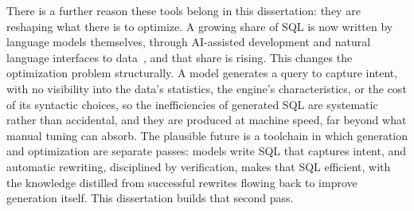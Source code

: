 There is a further reason these tools belong in this dissertation:
they are reshaping what there is to optimize. A growing share of SQL
is now written by language models themselves, through AI-assisted
development and natural language interfaces to
data~\cite{dbt2025state}, and that share is rising. This changes the
optimization problem structurally. A model generates a query to
capture intent, with no visibility into the data's statistics, the
engine's characteristics, or the cost of its syntactic choices, so
the inefficiencies of generated SQL are systematic rather than
accidental, and they are produced at machine speed, far beyond what
manual tuning can absorb. The plausible future is a toolchain in
which generation and optimization are separate passes: models write
SQL that captures intent, and automatic rewriting, disciplined by
verification, makes that SQL efficient, with the knowledge distilled
from successful rewrites flowing back to improve generation itself.
This dissertation builds that second pass.